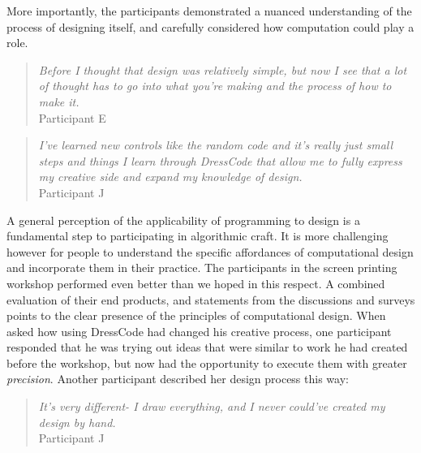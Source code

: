 \documentclass{sigchi}
\begin{document}
More importantly, the participants demonstrated a nuanced understanding of the process of designing itself, and carefully considered how computation could play a role. 
\begin{quotation}
	\textit{Before I thought that design was relatively simple, but now I see that a lot of thought has to go into what you're making and the process of how to make it.}
		\\Participant E
	\end{quotation}

\begin{quotation}
	\textit{I've learned new controls like the random code and it's really just small steps and things I learn through DressCode that allow me to fully express my creative side and expand my knowledge of design.}
	\\Participant J
\end{quotation}

A general perception of the applicability of programming to design is a fundamental step to participating in algorithmic craft. It is more challenging however for people to understand the specific affordances of computational design and incorporate them in their practice. The participants in the screen printing workshop performed even better than we hoped in this respect. A combined evaluation of their end products, and statements from the discussions and surveys points to the clear presence of the principles of computational design. When asked how using DressCode had changed his creative process, one participant responded that he was trying out ideas that were similar to work he had created before the workshop, but now had the opportunity to execute them with greater \textit{precision}. Another participant described her design process this way:
\begin{quotation}
	\textit{It's very different- I draw everything, and I never could've created my design by hand.}
	\\Participant J
\end{quotation}
\end{document}
